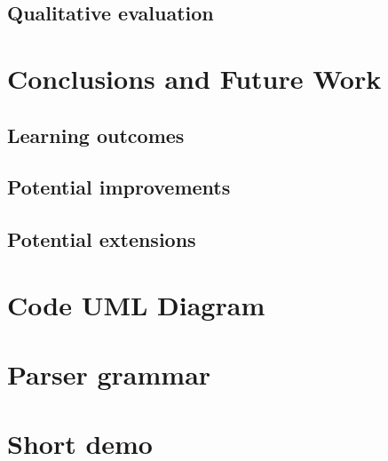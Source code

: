 \documentclass{report}
\begin{document}
\section{Qualitative evaluation}


\chapter{Conclusions and Future Work}
\section{Learning outcomes}
\section{Potential improvements}
\section{Potential extensions}


\begin{thebibliography}{9}


\end{thebibliography}


\appendix
\chapter{Code UML Diagram}
\chapter{Parser grammar}

\chapter{Short demo}

\end{document}
